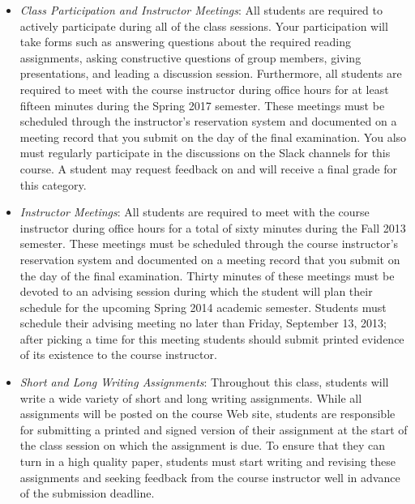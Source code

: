 \vspace*{-.05in}
\begin{itemize}


  \item {\em Class Participation and Instructor Meetings\/}: All students are required to actively participate during
    all of the class sessions. Your participation will take forms such as answering questions about the required reading
    assignments, asking constructive questions of group members, giving presentations, and leading a discussion session.
    Furthermore, all students are required to meet with the course instructor during office hours for at least fifteen
    minutes during the Spring 2017 semester. These meetings must be scheduled through the instructor's reservation
    system and documented on a meeting record that you submit on the day of the final examination. You also must
    regularly participate in the discussions on the Slack channels for this course. A student may request feedback on
    and will receive a final grade for this category.

  \item {\em Instructor Meetings}: All students are required to meet with the course instructor during office
    hours for a total of sixty minutes during the Fall 2013 semester.  These meetings must be scheduled through the
    course instructor's reservation system and documented on a meeting record that you submit on the day of the final
    examination.  Thirty minutes of these meetings must be devoted to an advising session during which the student
    will plan their schedule for the upcoming Spring 2014 academic semester.  Students must schedule their advising
    meeting no later than Friday, September 13, 2013; after picking a time for this meeting students should submit
    printed evidence of its existence to the course instructor.

  \item {\em Short and Long Writing Assignments}: Throughout this class, students will write a wide variety of short
    and long writing assignments.  While all assignments will be posted on the course Web site, students are
    responsible for submitting a printed and signed version of their assignment at the start of the class session on
    which the assignment is due.  To ensure that they can turn in a high quality paper, students must start writing
    and revising these assignments and seeking feedback from the course instructor well in advance of the submission
    deadline.


\end{itemize}
